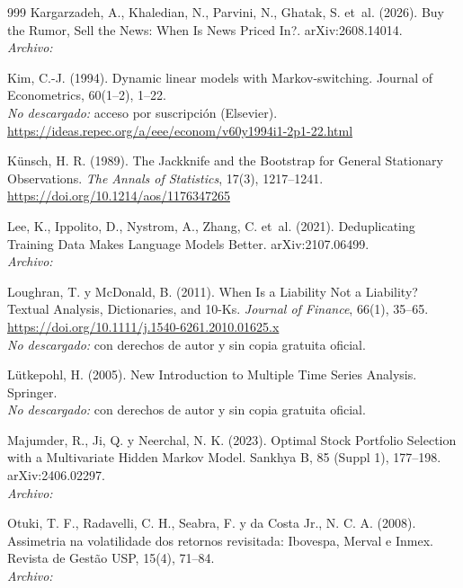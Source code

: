 \begin{thebibliography}{999}
Kargarzadeh, A., Khaledian, N., Parvini, N., Ghatak, S. et~al. (2026). Buy the Rumor, Sell the News: When Is News Priced In?. arXiv:2608.14014.
\\\textit{Archivo:} 

Kim, C.-J. (1994). Dynamic linear models with Markov-switching. Journal of Econometrics, 60(1–2), 1–22.
\\\textit{No descargado:} acceso por suscripción (Elsevier). \url{https://ideas.repec.org/a/eee/econom/v60y1994i1-2p1-22.html}

Künsch, H. R. (1989). The Jackknife and the Bootstrap for General Stationary Observations. \textit{The Annals of Statistics}, 17(3), 1217--1241. \url{https://doi.org/10.1214/aos/1176347265}

Lee, K., Ippolito, D., Nystrom, A., Zhang, C. et~al. (2021). Deduplicating Training Data Makes Language Models Better. arXiv:2107.06499.
\\\textit{Archivo:} 

Loughran, T. y McDonald, B. (2011). When Is a Liability Not a Liability? Textual Analysis, Dictionaries, and 10-Ks. \emph{Journal of Finance}, 66(1), 35--65. \url{https://doi.org/10.1111/j.1540-6261.2010.01625.x}
\\\textit{No descargado:} con derechos de autor y sin copia gratuita oficial.

L{\"u}tkepohl, H. (2005). New Introduction to Multiple Time Series Analysis. Springer.
\\\textit{No descargado:} con derechos de autor y sin copia gratuita oficial.

Majumder, R., Ji, Q. y Neerchal, N. K. (2023). Optimal Stock Portfolio Selection with a Multivariate Hidden Markov Model. Sankhya B, 85 (Suppl 1), 177–198. arXiv:2406.02297.
\\\textit{Archivo:} 

Otuki, T. F., Radavelli, C. H., Seabra, F. y da Costa Jr., N. C. A. (2008). Assimetria na volatilidade dos retornos revisitada: Ibovespa, Merval e Inmex. Revista de Gestão USP, 15(4), 71–84.
\\\textit{Archivo:} 


\end{thebibliography}
